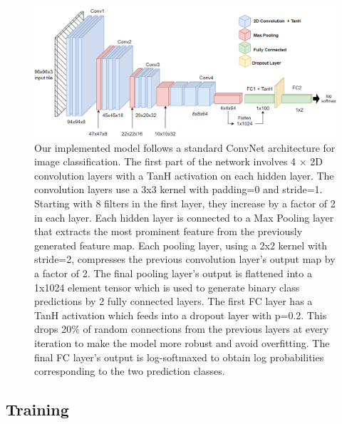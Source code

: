 \documentclass{l4proj}
\begin{document}
\begin{figure}[h]
    \centering
    \includegraphics[scale=0.5]{images/CNN-arch.png}
    \caption{Our implemented model follows a standard ConvNet architecture for image classification. The first part of the network involves 4 \(\times\) 2D convolution layers with a TanH activation on each hidden layer. The convolution layers use a 3x3 kernel with padding=0 and stride=1. Starting with 8 filters in the first layer, they increase by a factor of 2 in each layer. Each hidden layer is connected to a Max Pooling layer that extracts the most prominent feature from the previously generated feature map. Each pooling layer, using a 2x2 kernel with stride=2, compresses the previous convolution layer's output map by a factor of 2. The final pooling layer's output is flattened into a 1x1024 element tensor which is used to generate binary class predictions by 2 fully connected layers. The first FC layer has a TanH activation which feeds into a dropout layer with p=0.2. This drops 20\% of random connections from the previous layers at every iteration to make the model more robust and avoid overfitting. The final FC layer's output is log-softmaxed to obtain log probabilities corresponding to the two prediction classes.}
    \label{fig:CNN-Arch-diagram}
\end{figure}
 

\subsection{Training} \label{training-implementation}
\end{document}
